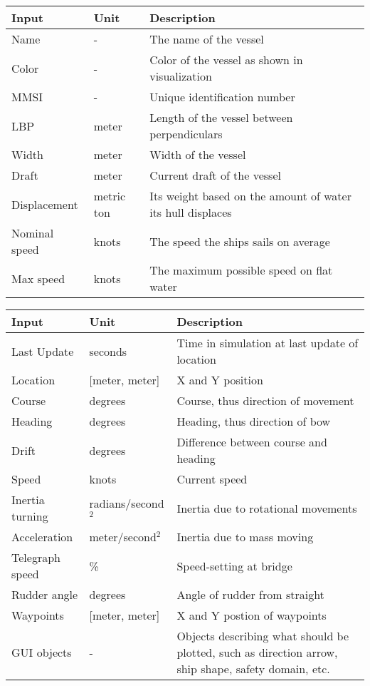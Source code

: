 \begin{table}[H]
	\centering
	\begin{tabular}{p{}|p{}|p{}}
		\toprule
		Input & Unit & Description\\
		\midrule
		Name & - & The name of the vessel\\
		Color & - & Color of the vessel as shown in visualization \\
		MMSI & - & Unique identification number \\
		LBP & meter & Length of the vessel between perpendiculars \\
		Width & meter & Width of the vessel \\
		Draft & meter & Current draft of the vessel\\
		Displacement & metric ton & Its weight based on the amount of water its hull displaces\\
		Nominal speed & knots & The speed the ships sails on average \\
		Max speed & knots & The maximum possible speed on flat water \\
		\bottomrule
	\end{tabular}
	
	\label{tab:input-ship-characteristics}
\end{table}

\begin{table}[H]
	\centering
	\begin{tabular}{p{}|p{}|p{}}
		\toprule
		Input & Unit & Description\\
		\midrule
		Last Update & seconds & Time in simulation at last update of location \\
		Location & [meter, meter] & X and Y position \\
		Course & degrees & Course, thus direction of movement \\
		Heading & degrees & Heading, thus direction of bow \\
		Drift & degrees & Difference between course and heading \\
		Speed & knots & Current speed \\
		Inertia turning & radians/second$^2$ & Inertia due to rotational movements \\
		Acceleration & meter/second$^2$ & Inertia due to mass moving \\
		Telegraph speed & \% & Speed-setting at bridge\\
		Rudder angle & degrees & Angle of rudder from straight \\
		Waypoints & [meter, meter] & X and Y postion of waypoints\\
		GUI objects & - & Objects describing what should be plotted, such as direction arrow, ship shape, safety domain, etc.\\
		\bottomrule
	\end{tabular}
	
	\label{tab:stored-ship-characteristics}
\end{table}

